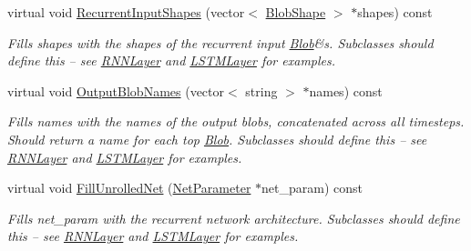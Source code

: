 \begin{DoxyCompactItemize}
\mbox{\label{classcaffe_1_1_r_n_n_layer_a586b4a2bb8959315d55c34704325bae6}} 
virtual void \mbox{\hyperlink{classcaffe_1_1_r_n_n_layer_a586b4a2bb8959315d55c34704325bae6}{Recurrent\+Input\+Shapes}} (vector$<$ \mbox{\hyperlink{classcaffe_1_1_blob_shape}{Blob\+Shape}} $>$ $\ast$shapes) const
\begin{DoxyCompactList}\small\item\em Fills shapes with the shapes of the recurrent input \mbox{\hyperlink{classcaffe_1_1_blob}{Blob}}\&s. Subclasses should define this -- see \mbox{\hyperlink{classcaffe_1_1_r_n_n_layer}{R\+N\+N\+Layer}} and \mbox{\hyperlink{classcaffe_1_1_l_s_t_m_layer}{L\+S\+T\+M\+Layer}} for examples. \end{DoxyCompactList}\item 
\mbox{\label{classcaffe_1_1_r_n_n_layer_a553fdd0dadf2a0cd9e5de265bd65da52}} 
virtual void \mbox{\hyperlink{classcaffe_1_1_r_n_n_layer_a553fdd0dadf2a0cd9e5de265bd65da52}{Output\+Blob\+Names}} (vector$<$ string $>$ $\ast$names) const
\begin{DoxyCompactList}\small\item\em Fills names with the names of the output blobs, concatenated across all timesteps. Should return a name for each top \mbox{\hyperlink{classcaffe_1_1_blob}{Blob}}. Subclasses should define this -- see \mbox{\hyperlink{classcaffe_1_1_r_n_n_layer}{R\+N\+N\+Layer}} and \mbox{\hyperlink{classcaffe_1_1_l_s_t_m_layer}{L\+S\+T\+M\+Layer}} for examples. \end{DoxyCompactList}\item 
\mbox{\label{classcaffe_1_1_r_n_n_layer_aa28664f9456a605b96fa1cd455930cf9}} 
virtual void \mbox{\hyperlink{classcaffe_1_1_r_n_n_layer_aa28664f9456a605b96fa1cd455930cf9}{Fill\+Unrolled\+Net}} (\mbox{\hyperlink{classcaffe_1_1_net_parameter}{Net\+Parameter}} $\ast$net\+\_\+param) const
\begin{DoxyCompactList}\small\item\em Fills net\+\_\+param with the recurrent network architecture. Subclasses should define this -- see \mbox{\hyperlink{classcaffe_1_1_r_n_n_layer}{R\+N\+N\+Layer}} and \mbox{\hyperlink{classcaffe_1_1_l_s_t_m_layer}{L\+S\+T\+M\+Layer}} for examples. \end{DoxyCompactList}\item 
\mbox{\label{classcaffe_1_1_r_n_n_layer_aaa0dfa8ce302d5344878e2bf7657a19f}} 

\end{DoxyCompactItemize}
